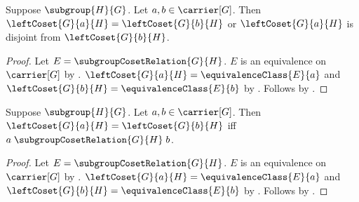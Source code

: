 \begin{theorem}\label{left_coset_eq_or_disjoint}
    Suppose $\subgroup{H}{G}$.
    Let $a,b\in\carrier[G]$.
    Then $\leftCoset{G}{a}{H}=\leftCoset{G}{b}{H}$ or
        $\leftCoset{G}{a}{H}$ is disjoint from
            $\leftCoset{G}{b}{H}$.
\end{theorem}
\begin{proof}
    Let $E=\subgroupCosetRelation{G}{H}$.
    $E$ is an equivalence on $\carrier[G]$ by
        .
    $\leftCoset{G}{a}{H}=\equivalenceClass{E}{a}$ and
        $\leftCoset{G}{b}{H}=\equivalenceClass{E}{b}$ by
        .
    Follows by .
\end{proof}

\begin{theorem}\label{left_coset_eq_iff}
    Suppose $\subgroup{H}{G}$.
    Let $a,b\in\carrier[G]$.
    Then $\leftCoset{G}{a}{H}=\leftCoset{G}{b}{H}$ iff
        $a\mathrel{\subgroupCosetRelation{G}{H}}b$.
\end{theorem}
\begin{proof}
    Let $E=\subgroupCosetRelation{G}{H}$.
    $E$ is an equivalence on $\carrier[G]$ by
        .
    $\leftCoset{G}{a}{H}=\equivalenceClass{E}{a}$ and
        $\leftCoset{G}{b}{H}=\equivalenceClass{E}{b}$ by
        .
    Follows by .
\end{proof}

